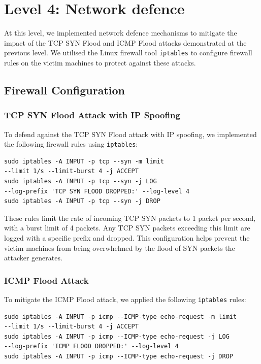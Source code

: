 \chapter{Level 4: Network defence}
At this level, we implemented network defence mechanisms to mitigate the impact of the TCP SYN Flood and ICMP Flood attacks demonstrated at the previous level. We utilised the Linux firewall tool \texttt{iptables} to configure firewall rules on the victim machines to protect against these attacks.

\section{Firewall Configuration}
\subsection{TCP SYN Flood Attack with IP Spoofing}
To defend against the TCP SYN Flood attack with IP spoofing, we implemented the following firewall rules using \texttt{iptables}:

\begin{verbatim}
sudo iptables -A INPUT -p tcp --syn -m limit 
--limit 1/s --limit-burst 4 -j ACCEPT
sudo iptables -A INPUT -p tcp --syn -j LOG 
--log-prefix 'TCP SYN FLOOD DROPPED:' --log-level 4
sudo iptables -A INPUT -p tcp --syn -j DROP
\end{verbatim}

These rules limit the rate of incoming TCP SYN packets to 1 packet per second, with a burst limit of 4 packets. Any TCP SYN packets exceeding this limit are logged with a specific prefix and dropped. This configuration helps prevent the victim machines from being overwhelmed by the flood of SYN packets the attacker generates.

\subsection{ICMP Flood Attack}
To mitigate the ICMP Flood attack, we applied the following \texttt{iptables} rules:

\begin{verbatim}
sudo iptables -A INPUT -p icmp --ICMP-type echo-request -m limit 
--limit 1/s --limit-burst 4 -j ACCEPT
sudo iptables -A INPUT -p icmp --ICMP-type echo-request -j LOG 
--log-prefix 'ICMP FLOOD DROPPED:' --log-level 4
sudo iptables -A INPUT -p icmp --ICMP-type echo-request -j DROP
\end{verbatim}

